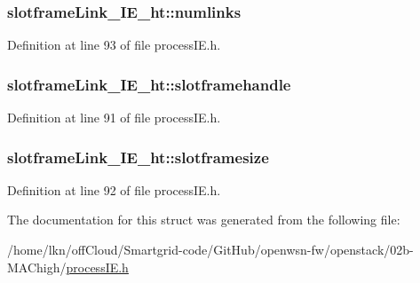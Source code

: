 \subsubsection[{\texorpdfstring{numlinks}{numlinks}}]{ slotframe\+Link\+\_\+\+I\+E\+\_\+ht\+::numlinks}\hypertarget{structslotframe_link___i_e__ht_ac554f296590cfbd80e643d94773f38bf}{}\label{structslotframe_link___i_e__ht_ac554f296590cfbd80e643d94773f38bf}


Definition at line 93 of file process\+I\+E.\+h.

\subsubsection[{\texorpdfstring{slotframehandle}{slotframehandle}}]{ slotframe\+Link\+\_\+\+I\+E\+\_\+ht\+::slotframehandle}\hypertarget{structslotframe_link___i_e__ht_a860a1e5709a032a55a704942c5de4c7c}{}\label{structslotframe_link___i_e__ht_a860a1e5709a032a55a704942c5de4c7c}


Definition at line 91 of file process\+I\+E.\+h.

\subsubsection[{\texorpdfstring{slotframesize}{slotframesize}}]{ slotframe\+Link\+\_\+\+I\+E\+\_\+ht\+::slotframesize}\hypertarget{structslotframe_link___i_e__ht_aeb904b1e08ac57dbc5251a3a3c08e978}{}\label{structslotframe_link___i_e__ht_aeb904b1e08ac57dbc5251a3a3c08e978}


Definition at line 92 of file process\+I\+E.\+h.



The documentation for this struct was generated from the following file\+:\begin{DoxyCompactItemize}
\item 
/home/lkn/off\+Cloud/\+Smartgrid-\/code/\+Git\+Hub/openwsn-\/fw/openstack/02b-\/\+M\+A\+Chigh/\hyperlink{process_i_e_8h}{process\+I\+E.\+h}\end{DoxyCompactItemize}
